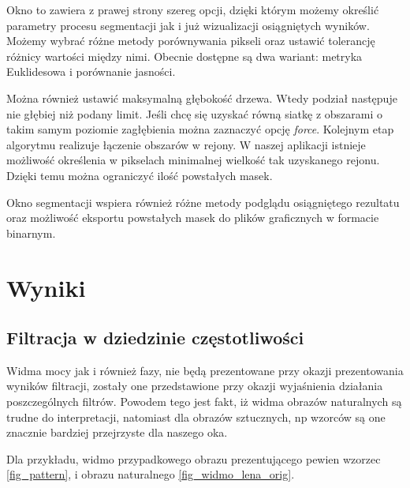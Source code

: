 \documentclass{classrep}
\begin{document}
Okno to zawiera z prawej strony szereg opcji, dzięki którym możemy określić parametry procesu segmentacji jak i już wizualizacji osiągniętych wyników. Możemy wybrać różne metody porównywania pikseli oraz ustawić tolerancję różnicy wartości między nimi. Obecnie dostępne są dwa wariant: metryka Euklidesowa i porównanie jasności. 

Można również ustawić maksymalną głębokość drzewa. Wtedy podział następuje nie głębiej niż podany limit. Jeśli chcę się uzyskać równą siatkę z obszarami o takim samym poziomie zagłębienia można zaznaczyć opcję \textit{force}. Kolejnym etap algorytmu realizuje łączenie obszarów w rejony. W naszej aplikacji istnieje możliwość określenia w pikselach minimalnej wielkość tak uzyskanego rejonu. Dzięki temu można ograniczyć ilość powstałych masek.

Okno segmentacji wspiera również różne metody podglądu osiągniętego rezultatu oraz możliwość eksportu powstałych masek do plików graficznych w formacie binarnym. 


\section{Wyniki}

\subsection{Filtracja w dziedzinie częstotliwości}

Widma mocy jak i również fazy, nie będą prezentowane przy okazji prezentowania wyników filtracji, zostały one przedstawione przy okazji wyjaśnienia działania poszczególnych filtrów. Powodem tego jest fakt, iż widma obrazów naturalnych są trudne do interpretacji, natomiast dla obrazów sztucznych, np wzorców są one znacznie bardziej przejrzyste dla naszego oka.

Dla przykładu, widmo przypadkowego obrazu prezentującego pewien wzorzec \ref{fig_pattern}, i obrazu naturalnego \ref{fig_widmo_lena_orig}.
\end{document}
